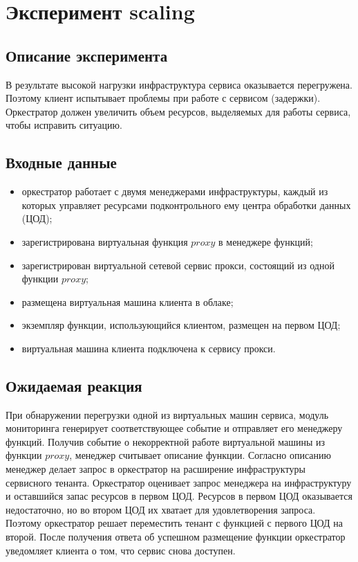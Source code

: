 \documentclass[oneside,final,14pt,a4paper]{extreport}
\begin{document}
\section{Эксперимент scaling}
\subsection{Описание эксперимента}
В результате высокой нагрузки инфраструктура сервиса оказывается перегружена. Поэтому клиент испытывает проблемы при работе с сервисом (задержки). Оркестратор должен увеличить объем ресурсов, выделяемых для работы сервиса, чтобы исправить ситуацию.

\subsection{Входные данные}
\begin{itemize}
	\item оркестратор работает с двумя менеджерами инфраструктуры, каждый из которых управляет ресурсами подконтрольного ему центра обработки данных (ЦОД);
	\item зарегистрирована виртуальная функция $proxy$ в менеджере функций;
	\item зарегистрирован виртуальной сетевой сервис прокси, состоящий из одной функции $proxy$;
	\item размещена виртуальная машина клиента в облаке;
	\item экземпляр функции, использующийся клиентом, размещен на первом ЦОД;
	\item виртуальная машина клиента подключена к сервису прокси.
\end{itemize}

\subsection{Ожидаемая реакция}
При обнаружении перегрузки одной из виртуальных машин сервиса, модуль мониторинга генерирует соответствующее событие и отправляет его менеджеру функций. Получив событие о некорректной работе виртуальной машины из функции $proxy$, менеджер считывает описание функции. Согласно описанию менеджер делает запрос в оркестратор на расширение инфраструктуры сервисного тенанта. Оркестратор оценивает запрос менеджера на инфраструктуру и оставшийся запас ресурсов в первом ЦОД. Ресурсов в первом ЦОД оказывается недостаточно, но во втором ЦОД их хватает для удовлетворения запроса. Поэтому оркестратор решает переместить тенант с функцией с первого ЦОД на второй. После получения ответа об успешном размещение функции оркестратор уведомляет клиента о том, что сервис снова доступен.
\end{document}

